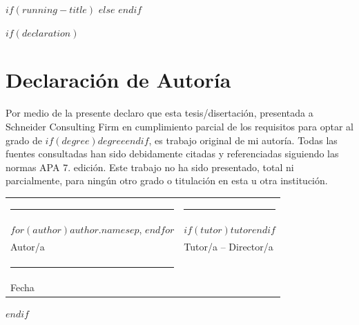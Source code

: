 
$if(running-title)$
  \def\scrunningtitle{$running-title$}
$else$
  \def\scrunningtitle{$title$}
$endif$

\maketitle

$if(declaration)$
\cleardoublepage
\chapter*{Declaraci\'{o}n de Autor\'{i}a}
\pagestyle{plain}

\noindent Por medio de la presente declaro que esta tesis/disertaci\'{o}n,
presentada a Schneider \textbar{} Consulting Firm en cumplimiento parcial
de los requisitos para optar al grado de
\textit{$if(degree)$$degree$$endif$}, es trabajo original de mi autor\'{i}a.
Todas las fuentes consultadas han sido debidamente citadas y referenciadas
siguiendo las normas APA 7.\textordfeminine{} edici\'{o}n.
Este trabajo no ha sido presentado, total ni parcialmente, para ning\'{u}n
otro grado o titulaci\'{o}n en esta u otra instituci\'{o}n.

\vspace{2.5cm}
\noindent\begin{tabular}{@{}p{6cm}p{6cm}@{}}
  \rule{5.5cm}{0.4pt} & \rule{5.5cm}{0.4pt} \\[4pt]
  $for(author)$$author.name$$sep$, $endfor$
    & $if(tutor)$$tutor$$endif$ \\
  \small Autor/a & \small Tutor/a -- Director/a \\[1.5cm]
  \rule{5.5cm}{0.4pt} & \\[4pt]
  \small Fecha & \\
\end{tabular}
$endif$

